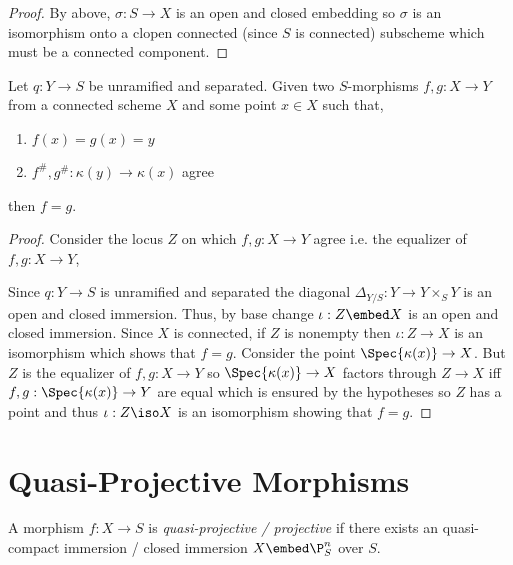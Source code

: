 \documentclass[12pt]{article}
\begin{document}
\begin{proof}
By above, $\sigma : S \to X$ is an open and closed embedding so $\sigma$ is an isomorphism onto a clopen connected (since $S$ is connected) subscheme which must be a connected component.
\end{proof}

\begin{prop}
Let $q : Y \to S$ be unramified and separated. Given two $S$-morphisms $f, g : X \to Y$ from a connected scheme $X$ and some point $x \in X$ such that,
\begin{enumerate}
\item $f(x) = g(x) = y$
\item $f^\#, g^\# : \kappa(y) \to \kappa(x)$ agree
\end{enumerate}
then $f = g$.
\end{prop}

\begin{proof}
Consider the locus $Z$ on which $f, g : X \to Y$ agree i.e. the equalizer of $f, g : X \to Y$,
\begin{center}
\end{center}
Since $q : Y \to S$ is unramified and separated the diagonal $\Delta_{Y/S} : Y \to Y \times_S Y$ is an open and closed immersion. Thus, by base change $\iota : Z \embed X$ is an open and closed immersion. Since $X$ is connected, if $Z$ is nonempty then $\iota : Z \to X$ is an isomorphism which shows that $f = g$. Consider the point $\Spec{\kappa(x)} \to X$. But $Z$ is the equalizer of $f, g : X \to Y$ so $\Spec{\kappa(x)} \to X$ factors through $Z \to X$ iff $f,g : \Spec{\kappa(x)} \to Y$ are equal which is ensured by the hypotheses so $Z$ has a point and thus $\iota : Z \iso X$ is an isomorphism showing that $f = g$.
\end{proof}

\section{Quasi-Projective Morphisms}

\begin{defn}
A morphism $f : X \to S$ is \textit{quasi-projective / projective} if there exists an quasi-compact immersion / closed immersion $X \embed \P^n_S$ over $S$.
\end{defn}
\end{document}
